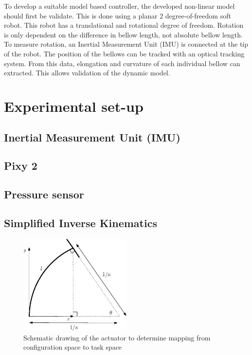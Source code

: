 To develop a suitable model based controller, the developed non-linear model should first be validate. This is done using a planar 2 degree-of-freedom soft robot. This robot has a translational and rotational degree of freedom. Rotation is only dependent on the difference in bellow length, not absolute bellow length. To measure rotation, an Inertial Measurement Unit (IMU) is connected at the tip of the robot. The position of the bellows can be tracked with an optical tracking system. From this data, elongation and curvature of each individual bellow can extracted. This allows validation of the dynamic model.


\section{Experimental set-up}


\subsection{Inertial Measurement Unit (IMU)}

\subsection{Pixy 2}

\subsection{Pressure sensor}


\subsection{Simplified Inverse Kinematics}


\begin{figure}[H]
    \centering
    \includegraphics[width = 0.5\textwidth]{Figures/Chapter5/fbdkinematics.eps}
    \caption{Schematic drawing of the actuator to determine mapping from configuration space to task space}
    \label{fig:my_label}
\end{figure}


